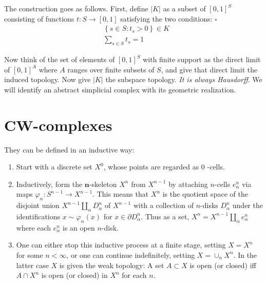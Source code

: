 The construction goes as follows. First, define $|K|$ as a subset of $[0,1]^S$ consisting of functions $t: S \rightarrow[0,1]$ satisfying the two conditions: $\square$
$$
\begin{aligned}
& \left\{s \in S: t_s>0\right\} \in K \\
& \sum_{s \in S} t_s=1
\end{aligned}
$$

Now think of the set of elements of $[0,1]^S$ with finite support as the direct limit of $[0,1]^A$ where $A$ ranges over finite subsets of $S$, and give that direct limit the induced topology. Now give $|K|$ the subspace topology. \textit{It is always Hausdorff}. We will identify an abstract simplicial complex with its geometric realization.



\section{CW-complexes}

They can be defined in an inductive way:

\begin{enumerate}
    \item Start with a discrete set $X^0$, whose points are regarded as 0 -cells.
    \item Inductively, form the $\boldsymbol{n}$-skeleton $X^n$ from $X^{n-1}$ by attaching $n$-cells $e_\alpha^n$ via maps $\varphi_\alpha: S^{n-1} \rightarrow X^{n-1}$. This means that $X^n$ is the quotient space of the disjoint union $X^{n-1} \amalg_\alpha D_\alpha^n$ of $X^{n-1}$ with a collection of $n$-disks $D_\alpha^n$ under the identifications $x \sim \varphi_\alpha(x)$ for $x \in \partial D_\alpha^n$. Thus as a set, $X^n=X^{n-1} \amalg_\alpha e_\alpha^n$ where each $e_\alpha^n$ is an open $n$-disk.
    \item One can either stop this inductive process at a finite stage, setting $X=X^n$ for some $n<\infty$, or one can continue indefinitely, setting $X=\cup_n X^n$. In the latter case $X$ is given the weak topology: A set $A \subset X$ is open (or closed) iff $A \cap X^n$ is open (or closed) in $X^n$ for each $n$.
    
\end{enumerate}

